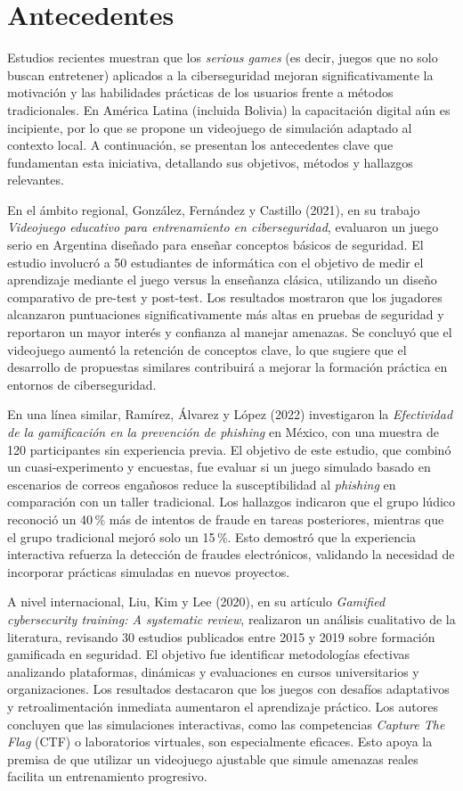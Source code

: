 \section{Antecedentes}

Estudios recientes muestran que los \textit{serious games} (es decir, juegos que no solo buscan entretener) aplicados a la ciberseguridad mejoran significativamente la motivación y las habilidades prácticas de los usuarios frente a métodos tradicionales. En América Latina (incluida Bolivia) la capacitación digital aún es incipiente, por lo que se propone un videojuego de simulación adaptado al contexto local. A continuación, se presentan los antecedentes clave que fundamentan esta iniciativa, detallando sus objetivos, métodos y hallazgos relevantes.

En el ámbito regional, González, Fernández y Castillo (2021), en su trabajo \textit{Videojuego educativo para entrenamiento en ciberseguridad}, evaluaron un juego serio en Argentina diseñado para enseñar conceptos básicos de seguridad. El estudio involucró a 50 estudiantes de informática con el objetivo de medir el aprendizaje mediante el juego versus la enseñanza clásica, utilizando un diseño comparativo de pre-test y post-test. Los resultados mostraron que los jugadores alcanzaron puntuaciones significativamente más altas en pruebas de seguridad y reportaron un mayor interés y confianza al manejar amenazas. Se concluyó que el videojuego aumentó la retención de conceptos clave, lo que sugiere que el desarrollo de propuestas similares contribuirá a mejorar la formación práctica en entornos de ciberseguridad.

En una línea similar, Ramírez, Álvarez y López (2022) investigaron la \textit{Efectividad de la gamificación en la prevención de phishing} en México, con una muestra de 120 participantes sin experiencia previa. El objetivo de este estudio, que combinó un cuasi-experimento y encuestas, fue evaluar si un juego simulado basado en escenarios de correos engañosos reduce la susceptibilidad al \textit{phishing} en comparación con un taller tradicional. Los hallazgos indicaron que el grupo lúdico reconoció un 40\,\% más de intentos de fraude en tareas posteriores, mientras que el grupo tradicional mejoró solo un 15\,\%. Esto demostró que la experiencia interactiva refuerza la detección de fraudes electrónicos, validando la necesidad de incorporar prácticas simuladas en nuevos proyectos.

A nivel internacional, Liu, Kim y Lee (2020), en su artículo \textit{Gamified cybersecurity training: A systematic review}, realizaron un análisis cualitativo de la literatura, revisando 30 estudios publicados entre 2015 y 2019 sobre formación gamificada en seguridad. El objetivo fue identificar metodologías efectivas analizando plataformas, dinámicas y evaluaciones en cursos universitarios y organizaciones. Los resultados destacaron que los juegos con desafíos adaptativos y retroalimentación inmediata aumentaron el aprendizaje práctico. Los autores concluyen que las simulaciones interactivas, como las competencias \textit{Capture The Flag} (CTF) o laboratorios virtuales, son especialmente eficaces. Esto apoya la premisa de que utilizar un videojuego ajustable que simule amenazas reales facilita un entrenamiento progresivo.

